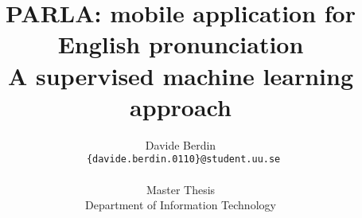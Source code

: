 \documentclass{report}
\title{PARLA: mobile application for English pronunciation \\ A supervised machine learning approach}
\author{Davide Berdin \\
  \texttt{ \{davide.berdin.0110\}@student.uu.se} \\
  \\ Master Thesis
  \\ Department of Information Technology}
\newcommand\blankpage{%
    \null
    \thispagestyle{empty}%
    \addtocounter{page}{-1}%
    \newpage}
\begin{document}
\maketitle

\begin{abstract}

\end{abstract}

\blankpage

\blankpage

\renewcommand{\abstractname}{Acknowledgements}
\begin{abstract}

\end{abstract}

\tableofcontents{}

\listoffigures






%





{
	
	
}



\end{document}
